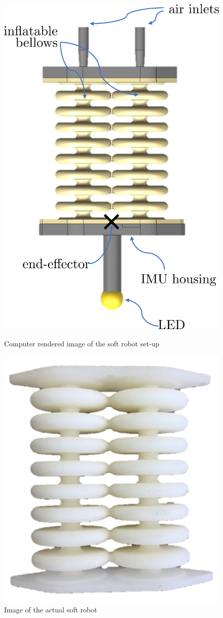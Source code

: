\begin{figure}[H]
\centering
\begin{minipage}{.5\textwidth}
  \centering
  \includegraphics[width = 0.8\linewidth]{Figures/Chapter1/completesetup2.png}
  \caption{Computer rendered image of the soft robot set-up }
  \label{fig:test1}
\end{minipage}%
\begin{minipage}{.5\textwidth}
  \centering
  \includegraphics[width =0.8\linewidth]{Figures/Chapter1/actuator.png}
  \vspace{50pt}
  \caption{Image of the actual soft robot}
  \label{fig:test2}
\end{minipage}
\end{figure}
